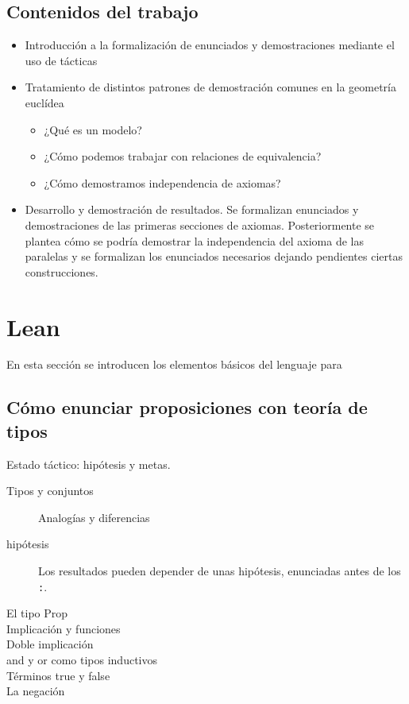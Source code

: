 \documentclass[12pt, spanish]{TFG}
\begin{document}
\subsection{Contenidos del trabajo}

\begin{itemize}

    \item Introducción a la formalización de enunciados y demostraciones
        mediante el uso de tácticas

    \item Tratamiento de distintos patrones de demostración comunes en la
        geometría euclídea
        \begin{itemize}
            \item ¿Qué es un modelo?
            \item ¿Cómo podemos trabajar con relaciones de equivalencia?
            \item ¿Cómo demostramos independencia de axiomas?
        \end{itemize}

    \item Desarrollo y demostración de resultados. Se formalizan enunciados y
        demostraciones de las primeras secciones de axiomas. Posteriormente se
        plantea cómo se podría demostrar la independencia del axioma de las
        paralelas y se formalizan los enunciados necesarios dejando pendientes
        ciertas construcciones.

\end{itemize}

\newpage
\section{Lean}

En esta sección se introducen los elementos básicos del lenguaje para

\subsection{Cómo enunciar proposiciones con teoría de tipos}

Estado táctico: hipótesis y metas.

\begin{description}
    \item[Tipos y conjuntos] Analogías y diferencias
    \item[hipótesis] Los resultados pueden depender de unas hipótesis,
        enunciadas antes de los \lstinline{:}.
    \item[El tipo Prop] 
    \item[Implicación y funciones] 
    \item[Doble implicación] 
    \item[and y or como tipos inductivos] 
    \item[Términos true y false] 
    \item[La negación] 
\end{description}
\end{document}
